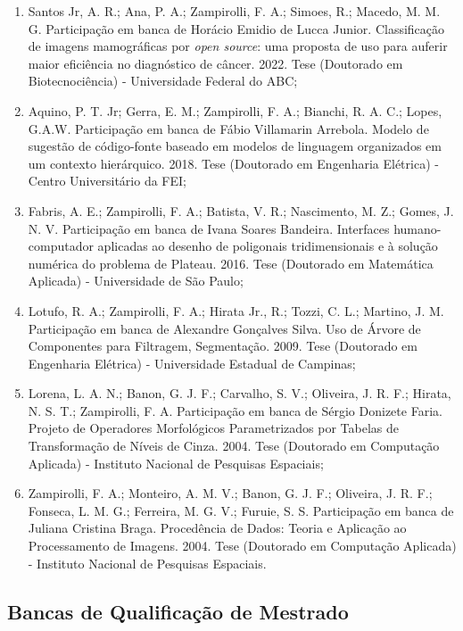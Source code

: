 \begin{enumerate}
    \item Santos Jr, A. R.; Ana, P. A.; Zampirolli, F. A.; Simoes, R.; Macedo, M. M. G. Participação em banca de Horácio Emidio de Lucca Junior. Classificação de imagens mamográficas por \textit{open source}: uma proposta de uso para auferir maior eficiência no diagnóstico de câncer. 2022. Tese (Doutorado em Biotecnociência) - Universidade Federal do ABC;
    \item Aquino, P. T. Jr; Gerra, E. M.; Zampirolli, F. A.; Bianchi, R. A. C.; Lopes, G.A.W. Participação em banca de Fábio Villamarin Arrebola. Modelo de sugestão de código-fonte baseado em modelos de linguagem organizados em um contexto hierárquico. 2018. Tese (Doutorado em Engenharia Elétrica) - Centro Universitário da FEI;
    \item Fabris, A. E.; Zampirolli, F. A.; Batista, V. R.; Nascimento, M. Z.; Gomes, J. N. V. Participação em banca de Ivana Soares Bandeira. Interfaces humano-computador aplicadas ao desenho de poligonais tridimensionais e à solução numérica do problema de Plateau. 2016. Tese (Doutorado em Matemática Aplicada) - Universidade de São Paulo;
    \item Lotufo, R. A.; Zampirolli, F. A.; Hirata Jr., R.; Tozzi, C. L.; Martino, J. M. Participação em banca de Alexandre Gonçalves Silva. Uso de Árvore de Componentes para Filtragem, Segmentação. 2009. Tese (Doutorado em Engenharia Elétrica) - Universidade Estadual de Campinas;
    \item Lorena, L. A. N.; Banon, G. J. F.; Carvalho, S. V.; Oliveira, J. R. F.; Hirata, N. S. T.; Zampirolli, F. A. Participação em banca de Sérgio Donizete Faria. Projeto de Operadores Morfológicos Parametrizados por Tabelas de Transformação de Níveis de Cinza. 2004. Tese (Doutorado em Computação Aplicada) - Instituto Nacional de Pesquisas Espaciais;
    \item Zampirolli, F. A.; Monteiro, A. M. V.; Banon, G. J. F.; Oliveira, J. R. F.; Fonseca, L. M. G.; Ferreira, M. G. V.; Furuie, S. S. Participação em banca de Juliana Cristina Braga. Procedência de Dados: Teoria e Aplicação ao Processamento de Imagens. 2004. Tese (Doutorado em Computação Aplicada) - Instituto Nacional de Pesquisas Espaciais.
\end{enumerate}

\subsection{Bancas de Qualificação de Mestrado}


